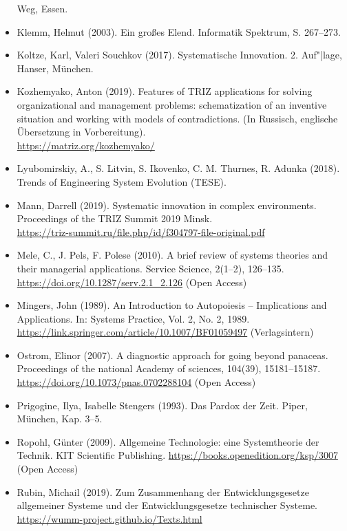 \documentclass[11pt,a4paper]{article}
\begin{document}
\begin{itemize}
  Weg, Essen.
\item Klemm, Helmut (2003). Ein großes Elend. Informatik Spektrum,
  S. 267--273. 
\item Koltze, Karl, Valeri Souchkov (2017). Systematische Innovation.
  2. Auf"|lage, Hanser, München.
\item Kozhemyako, Anton (2019). Features of TRIZ applications for solving
  organizational and management problems: schematization of an inventive
  situation and working with models of contradictions. (In Russisch, englische
  Übersetzung in Vorbereitung).\\ \url{https://matriz.org/kozhemyako/}
\item Lyubomirskiy, A., S. Litvin, S. Ikovenko, C. M. Thurnes, R. Adunka
  (2018).  Trends of Engineering System Evolution (TESE).
\item Mann, Darrell (2019).  Systematic innovation in complex
  environments. Proceedings of the TRIZ Summit 2019 Minsk.\\
  \url{https://triz-summit.ru/file.php/id/f304797-file-original.pdf} 
\item Mele, C., J. Pels, F. Polese (2010). A brief review of systems theories
  and their managerial applications. Service Science, 2(1--2), 126--135.\\
  \url{https://doi.org/10.1287/serv.2.1_2.126} (Open Access)
\item Mingers, John (1989). An Introduction to Autopoiesis -- Implications and
  Applications. In: Systems Practice, Vol. 2, No. 2, 1989.\\
  \url{https://link.springer.com/article/10.1007/BF01059497} (Verlagsintern) 
\item Ostrom, Elinor (2007). A diagnostic approach for going beyond panaceas.
  Proceedings of the national Academy of sciences, 104(39), 15181--15187.\\
  \url{https://doi.org/10.1073/pnas.0702288104} (Open Access)
\item Prigogine, Ilya, Isabelle Stengers (1993). Das Pardox der Zeit. Piper,
  München, Kap. 3--5.  
\item Ropohl, Günter (2009). Allgemeine Technologie: eine Systemtheorie der
  Technik.  KIT Scientific Publishing.
  \url{https://books.openedition.org/ksp/3007} (Open Access) 
\item Rubin, Michail (2019).  Zum Zusammenhang der Entwicklungsgesetze
  allgemeiner Systeme und der Entwicklungsgesetze technischer Systeme. \\
  \url{https://wumm-project.github.io/Texts.html} 

\end{itemize}
\end{document}
